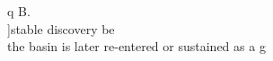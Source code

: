 {{{{{q B.\n\\]\nLet stable discovery be\n\\[\n\\mathcal{D}_B^\\ast(\\tau;t)\n\\]\nwhen the basin is later re-entered or sustained as a g}}}}}
